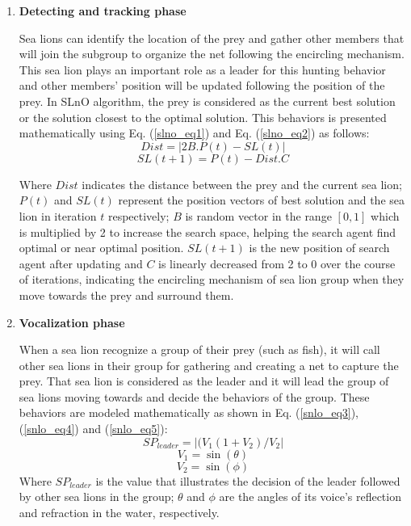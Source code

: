 \documentclass[a4paper,13pt,2p]{report}
\begin{document}
\begin{enumerate}
\item \textbf{Detecting and tracking phase}

	Sea lions can identify the location of the prey and gather other members that will join the subgroup to organize the net following the encircling mechanism. This sea lion plays an important role as a leader for this hunting behavior and other members' position will be updated following the position of the prey. In SLnO algorithm, the prey is considered as the current best solution or the solution closest to the optimal solution. This behaviors is presented mathematically using Eq. (\ref{slno_eq1}) and Eq. (\ref{slno_eq2}) as follows:
\begin{equation}\label{slno_eq1}
Dist = |2B.P(t) - SL(t)|
\end{equation}
\begin{equation}\label{slno_eq2}
SL(t+1) = P(t) - Dist.C
\end{equation}
	
	Where $Dist$ indicates the distance between the prey and the current sea lion; $P(t)$ and $SL(t)$ represent the position vectors of best solution and the sea lion in iteration $t$ respectively; $B$ is random vector in the range $[0, 1]$ which is multiplied by 2 to increase the search space, helping the search agent find optimal or near optimal position. $SL(t+1)$ is the new position of search agent after updating and $C$ is linearly decreased from 2 to 0 over the course of iterations, indicating the encircling mechanism of sea lion group when they move towards the prey and surround them.

\item \textbf{Vocalization phase}
	
	When a sea lion recognize a group of their prey (such as fish), it will call other sea lions in their group for gathering and creating a net to capture the prey. That sea lion is considered as the leader and it will lead the group of sea lions moving towards and decide the behaviors of the group. These behaviors are modeled mathematically as shown in Eq. (\ref{snlo_eq3}), (\ref{snlo_eq4}) and (\ref{snlo_eq5}):
\begin{equation}\label{snlo_eq3}
SP_{leader} = |(V_1(1+V_2)/V_2|
\end{equation}
\begin{equation}\label{snlo_eq4}
V_1 = \sin(\theta)
\end{equation}
\begin{equation}\label{snlo_eq5}
V_2 = \sin(\phi)
\end{equation}
 Where $SP_{leader}$ is the value that illustrates the decision of the leader followed by other sea lions in the group; $\theta$ and $\phi$ are the angles of its voice's reflection and refraction in the water, respectively.
 

\end{enumerate}
\end{document}
